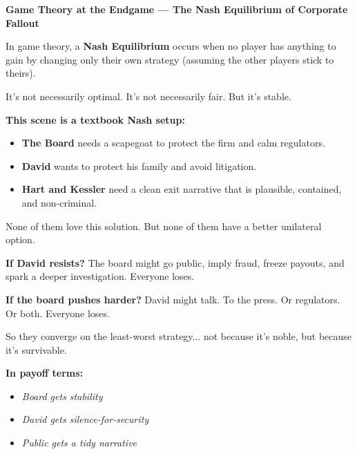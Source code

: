 \begin{TechnicalSidebar}{\textbf{Game Theory at the Endgame --- The Nash Equilibrium of Corporate Fallout}}

    In game theory, a \textbf{Nash Equilibrium} occurs when no player has anything to gain by changing 
    only their own strategy (assuming the other players stick to theirs).

    \medskip
    
    It’s not necessarily optimal.  
    It’s not necessarily fair.  
    But it’s stable.
    
    \medskip
    
    \textbf{This scene is a textbook Nash setup:}

    \medskip
    
    \begin{itemize}
      \item \textbf{The Board} needs a scapegoat to protect the firm and calm regulators.
      \item \textbf{David} wants to protect his family and avoid litigation.
      \item \textbf{Hart and Kessler} need a clean exit narrative that is plausible, contained, 
      and non-criminal.
    \end{itemize}

    \medskip
    
    None of them love this solution.  
    But none of them have a better unilateral option.
    
    \medskip
    
    \textbf{If David resists?}  
    The board might go public, imply fraud, freeze payouts, and spark a deeper investigation.  
    Everyone loses.
    
    \textbf{If the board pushes harder?}  
    David might talk. To the press. Or regulators. Or both.  
    Everyone loses.
    
    \medskip
    
    So they converge on the least-worst strategy... not because it’s noble, but because it’s survivable.
    
    \medskip
    
    \textbf{In payoff terms:}

    \medskip
    
    \begin{itemize}
      \item \textit{Board gets stability}
      \item \textit{David gets silence-for-security}
      \item \textit{Public gets a tidy narrative}
    \end{itemize}
    

\end{TechnicalSidebar}
